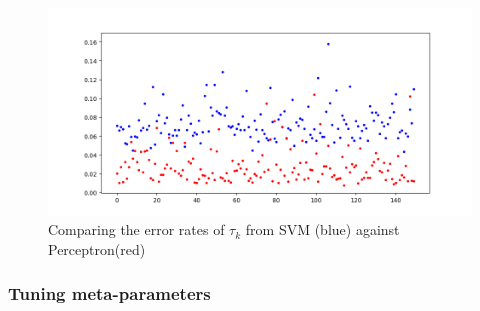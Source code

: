 \begin{figure}[!h]
\begin{center}
\centering
\includegraphics[width=1\textwidth]{figures/lin_svm_perc_error.png}
\end{center}
\caption{\label{fig:error_SVM_perc} Comparing the error rates of $\tau_k$ from SVM (blue) against Perceptron(red) }
\end{figure}



\subsubsection{Tuning meta-parameters}




